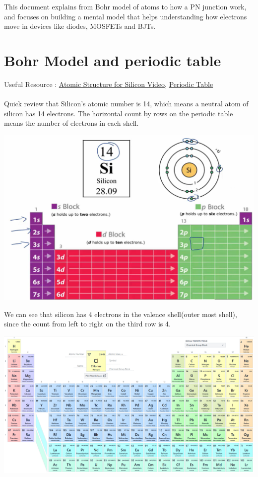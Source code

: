 \documentclass{article}
\begin{document}
	This document explains from Bohr model of atoms to how a PN junction work, and focuses on building a mental model that helps understanding how electrons move in devices like diodes, MOSFETs and BJTs.
	\section{Bohr Model and periodic table}
		Useful Resource : \href{https://www.youtube.com/watch?v=OCTAQaubQ4o&ab_channel=WayneBreslyn%28Dr.B.%29}{Atomic Structure for Silicon Video}, \href{https://pubchem.ncbi.nlm.nih.gov/periodic-table/}{Periodic Table}\\\\
		Quick review that Silicon's atomic number is 14, which means a neutral atom of silicon has 14 electrons. The horizontal count by rows on the periodic table means the number of electrons in each shell.
		\begin{center}
			\includegraphics[width=\textwidth]{img/si_element.png}
		\end{center}
		We can see that silicon has 4 electrons in the valence shell(outer most shell), since the count from left to right on the third row is 4.
		\begin{center}
			\includegraphics[width=\textwidth]{img/periodic_table.png}
		\end{center}
\end{document}

